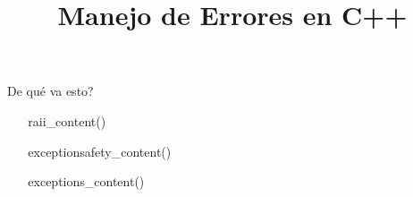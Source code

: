 

\title%
{Manejo de Errores en C++}


\subject{Manejo de Errores en C++}


\usepackage{docmute}


\begin{frame}
   \titlepage
\end{frame}

\begin{frame}{De qu\'e va esto?}
   \tableofcontents
\end{frame}

~%
~{ raii_content() }~

~%
~{ exceptionsafety_content() }~

~%
~{ exceptions_content() }~




